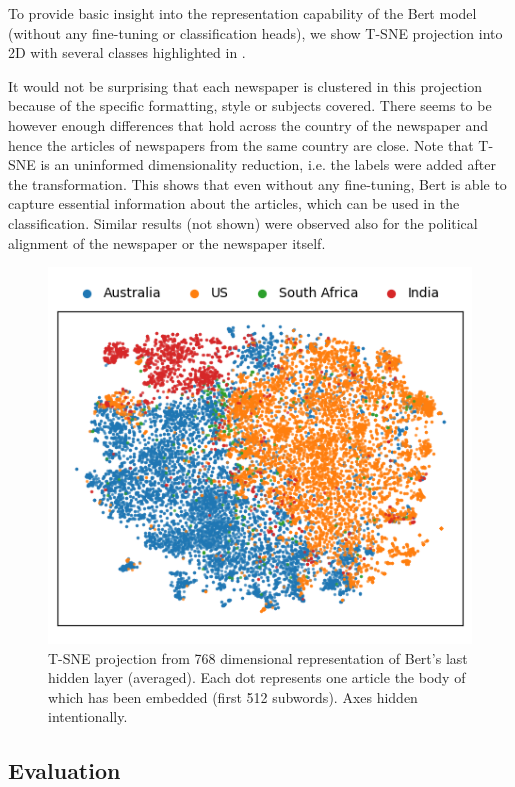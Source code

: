 To provide basic insight into the representation capability of the Bert model (without any fine-tuning or classification heads), we show T-SNE \cite{tsne} projection into 2D with several classes highlighted in .

It would not be surprising that each newspaper is clustered in this projection because of the specific formatting, style or subjects covered.
There seems to be however enough differences that hold across the country of the newspaper and hence the articles of newspapers from the same country are close.
Note that T-SNE is an uninformed dimensionality reduction, i.e. the labels were added after the transformation.
This shows that even without any fine-tuning, Bert is able to capture essential information about the articles, which can be used in the classification. 
Similar results (not shown) were observed also for the political alignment of the newspaper or the newspaper itself.

\begin{figure}[ht]
\centering
\includegraphics[width=1\linewidth]{img/tsne_ncountry.png}
\caption{T-SNE projection from 768 dimensional representation of Bert's last hidden layer (averaged). Each dot represents one article the body of which has been embedded (first 512 subwords). Axes hidden intentionally.}
\label{fig:tsne}
\end{figure}

\subsection{Evaluation} \label{subsec:evaluation}

